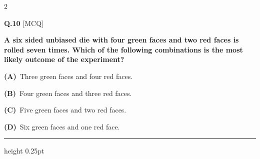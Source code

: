\documentclass[a4paper,10pt,twoside]{article}
\begin{document}
\begin{multicols}{2}
\vspace{6pt}
\vspace{3pt}

\noindent\textbf{Q.10} \hfill {\footnotesize\textsf{[MCQ]}}
\par\vspace{2pt}
{\bfseries A six sided unbiased die with four green faces and two red faces is rolled seven times.
Which of the following combinations is the most likely outcome of the experiment? \par}
\par\vspace{2pt}\noindent
\textbf{(A)}~Three green faces and four red faces.\par\vspace{2pt}\noindent
\textbf{(B)}~Four green faces and three red faces.\par\vspace{2pt}\noindent
\textbf{(C)}~Five green faces and two red faces.\par\vspace{2pt}\noindent
\textbf{(D)}~Six green faces and one red face.
\par\vspace{6pt}\hrule height 0.25pt\vspace{6pt}

\vspace{6pt}
\vspace{3pt}


\end{multicols}
\end{document}
